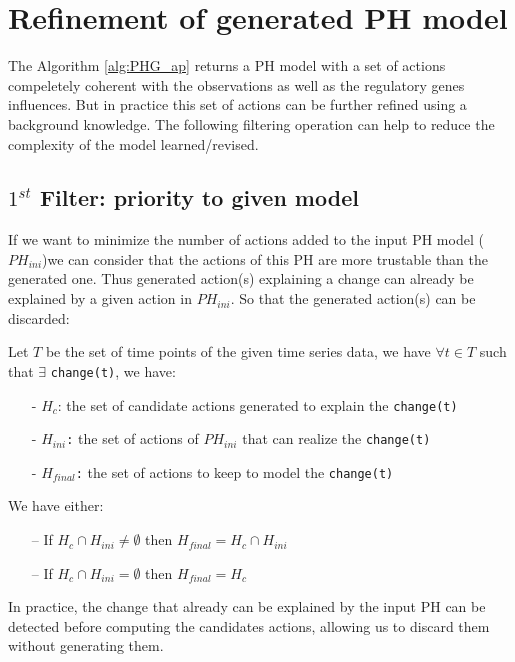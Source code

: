 \section{Refinement of generated PH model }
\label{sec:refinement-filters}
The Algorithm \ref{alg:PHG_ap} returns a PH model with a set of actions compeletely coherent with the observations as well as the regulatory genes influences.
But in practice this set of actions can be further refined using a background knowledge.
The following filtering operation can help to reduce the complexity of the model learned/revised.

\subsection{$1^{st}$ Filter: priority to given model}

If we want to minimize the number of actions added to the input PH  model ($PH_{ini}$)we can consider that the actions of this PH are more trustable than the generated one. Thus generated action(s) explaining a change can already be explained by a given action in $PH_{ini}$. So that the generated action(s) can be discarded:\\
\begin{definition}
Let $T$ be the set of time points of the given time series data, we have $\forall t \in T$ such that $\exists$  \texttt{change(t)}, we have:
\begin{itemize}
\item[-] \texttt{$H_c$}: the set of candidate actions generated to explain the \texttt{change(t)}
\item[-] \texttt{$H_{ini}$:} the set of actions of $PH_{ini}$ that can realize the \texttt{change(t)}
\item[-] \texttt{$H_{final}$:} the set of actions to keep to model the \texttt{change(t)}
\end{itemize}
We have either:
\begin{itemize}
\item[--] If $H_c \cap H_{ini} \neq \emptyset $ then $H_{final}= H_c \cap H_{ini}$ 
\item[--] If $H_c \cap H_{ini} = \emptyset $ then $H_{final}=H_c$
\end{itemize}
\end{definition}
In practice, the change that already can be explained by the input PH can be detected before computing the candidates actions, allowing us to discard them without generating them.

